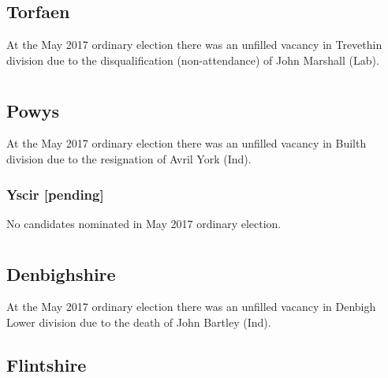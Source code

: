 \documentclass[a4paper,openany]{book}
\begin{document}
\begin{resultsiii}
\subsection*{Torfaen}

At the May 2017 ordinary election there was an unfilled vacancy in Trevethin division due to the disqualification (non-attendance) of John Marshall (Lab).

\section[Mid and West Wales]{}

\subsection*{Powys}

At the May 2017 ordinary election there was an unfilled vacancy in Builth division due to the resignation of Avril York (Ind).

\subsubsection*{Yscir \hspace*{\fill}\nolinebreak[1]%
\enspace\hspace*{\fill}
[pending]}


No candidates nominated in May 2017 ordinary election.

\section[North Wales]{}

\subsection*{Denbighshire}

At the May 2017 ordinary election there was an unfilled vacancy in Denbigh Lower division due to the death of John Bartley (Ind).

\subsection*{Flintshire}


\end{resultsiii}
\end{document}
